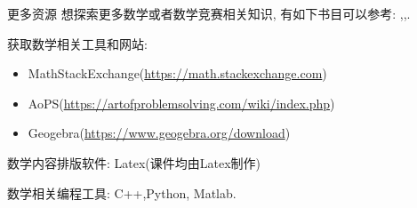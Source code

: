 \documentclass{beamer}
\theoremstyle{definition}
\begin{document}
\begin{frame}{更多资源}
    想探索更多数学或者数学竞赛相关知识, 有如下书目可以参考:
    \cite{潘承洞2003初等数论},\cite{美国数学竞赛指南},\cite{组合数学}.
    
\end{frame}
\begin{frame}
    获取数学相关工具和网站:
    \begin{itemize}
        \item MathStackExchange(\url{https://math.stackexchange.com})
        \item AoPS(\url{https://artofproblemsolving.com/wiki/index.php})
        \item Geogebra(\url{https://www.geogebra.org/download})
    \end{itemize}
    数学内容排版软件: Latex(课件均由Latex制作)

    数学相关编程工具: C++,Python, Matlab.
\end{frame}
\end{document}

